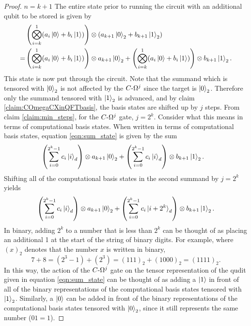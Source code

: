 \begin{appendices}
\begin{proof}
    $n=k+1$\newline
    The entire state prior to running the circuit with an additional qubit to be stored is given by
    \begin{align}
        &\left(\bigotimes_{i = k}^{1}(a_i\ket{0} + b_i\ket{1})\right)\otimes(a_{k+1}\ket{0}_2 + b_{k+1}\ket{1}_2)\\
        =&\left(\bigotimes_{i = k}^{1}(a_i\ket{0} + b_i\ket{1})\right)\otimes a_{k+1}\ket{0}_2\label{eqn:sum_state}
        +
        \left(\bigotimes_{i = k}^{1}(a_i\ket{0} + b_i\ket{1})\right)\otimes b_{k+1}\ket{1}_2.
    \end{align}
    This state is now put through the circuit.
    Note that the summand which is tensored with $\ket{0}_2$ is not affected by the $C\text{-}\Omega^j$ since the target is $\ket{0}_2$.
    Therefore only the summand tensored with $\ket{1}_2$ is advanced, and by claim \ref{claim:COmegaCXinQFTbasis}, the basis states are shifted up by $j$ steps.
    From claim \ref{claim:min_steps}, for the $C\text{-}\Omega^j$ gate, $j = 2^k$.
    Consider what this means in terms of computational basis states.
    When written in terms of computational basis states, equation \ref{eqn:sum_state} is given by the sum
    \begin{align}
        &\left(\sum_{i=0}^{2^k - 1}c_i\ket{i}_d\right) \otimes a_{k+1}\ket{0}_2
        +\left(\sum_{i=0}^{2^k - 1}c_i\ket{i}_d\right) \otimes b_{k+1}\ket{1}_2.
    \end{align}
    Shifting all of the computational basis states in the second summand by $j=2^k$ yields
    \begin{align}
        \left(\sum_{i=0}^{2^k - 1}c_i\ket{i}_d\right) \otimes a_{k+1}\ket{0}_2
        +\left(\sum_{i=0}^{2^k - 1}c_i\ket{i + 2^k}_d\right) \otimes b_{k+1}\ket{1}_2.
    \end{align}
    In binary, adding $2^k$ to a number that is less than $2^k$ can be thought of as placing an additional 1 at the start of the string of binary digits.
    For example, where $(x)_2$ denotes that the number $x$ is written in binary,
    \begin{equation}
        7 + 8 = (2^3 - 1) + (2^3) = (111)_2 + (1000)_2 = (1111)_2.
    \end{equation}
    In this way, the action of the $C\text{-}\Omega^j$ gate on the tensor representation of the qudit given in equation \ref{eqn:sum_state} can be thought of as adding a $\ket{1}$ in front of all of the binary representations of the computational basis states tensored with $\ket{1}_2$.
    Similarly, a $\ket{0}$ can be added in front of the binary representations of the computational basis states tensored with $\ket{0}_2$, since it still represents the same number ($01 = 1$).

\end{proof}
\end{appendices}
